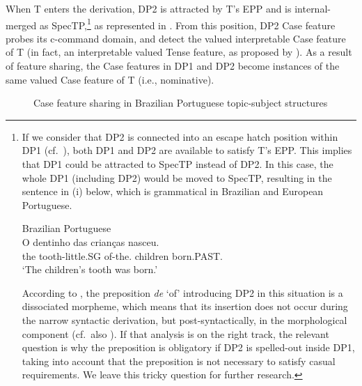 \documentclass[output=paper]{langsci/langscibook}
\begin{document}
When T enters the derivation, DP2 is attracted by T’s \gls{EPP} and is internal-merged as SpecTP,\footnote{If we
    consider that DP2 is connected into an escape hatch position within DP1
    (cf.\ \citealt{Avelar2006}), both DP1 and DP2 are available to satisfy T’s
    \gls{EPP}. This implies that DP1 could be attracted to SpecTP instead of
    DP2. In this case, the whole DP1 (including DP2) would be moved to SpecTP,
    resulting in the sentence in (i) below, which is grammatical in Brazilian
    and European Portuguese.

    \begin{exe}
        Brazilian Portuguese\\
        \gll    O dentinho das   crianças nasceu.\\
                the tooth-little.SG of-the.\Pl{} children born.PAST.\Tsg{}\\
        \glt    ‘The children’s tooth was born.’
    \end{exe}

According to \citet{Avelar2006}, the preposition \emph{de} ‘of’ introducing DP2
in this situation is a dissociated morpheme, which means that its insertion
does not occur during the narrow syntactic derivation, but post-syntactically,
in the morphological component (cf.\ also \citealt{Raposo2002}). If that
analysis is on the right track, the relevant question is why the preposition is
obligatory if DP2 is spelled-out inside DP1, taking into account that the
preposition is not necessary to satisfy casual requirements.  We leave this
tricky question for further research.} as represented in . From
this position, DP2 Case feature probes its c-command domain, and detect the
valued interpretable Case feature of T (in fact, an interpretable valued Tense
feature, as proposed by \citealt{PesTor2004}). As a result of feature
sharing, the Case features in DP1 and DP2 become instances of the same valued
Case feature of T (i.e., nominative).

\begin{figure}%
    \caption{Case feature sharing in Brazilian Portuguese topic-subject
    structures\label{fig:ex:14.35}}
\end{figure}
\end{document}

